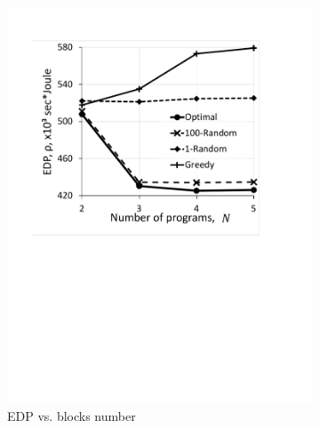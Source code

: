 \begin{figure}
    \centering
    \begin{subfigure}{0.4\textwidth}
        \includegraphics[width=\linewidth]{figs/EDPVsPrograms.pdf}
        \caption{EDP vs. blocks number}
        \label{fig:EDPVsPrograms}
    \end{subfigure}
    \hspace{15mm}
    \begin{subfigure}{0.38\textwidth}

\end{subfigure}
\end{figure}
